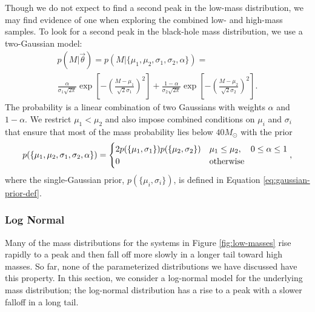 \documentclass[preprint]{aastex}
\newcommand{\Msun}{M_\odot}
\newcommand{\vtheta}{\vec{\theta}}
\begin{document}
Though we do not expect to find a second peak in the low-mass
distribution, we may find evidence of one when exploring the combined
low- and high-mass samples.  To look for a second peak in the
black-hole mass distribution, we use a two-Gaussian model:
\begin{multline}
  \label{eq:two-gaussian-def}
  p(M|\vtheta) = p(M|\{\mu_1, \mu_2, \sigma_1, \sigma_2, \alpha\}) = \\
  \frac{\alpha}{\sigma_1 \sqrt{2\pi}} \exp\left[ - \left( \frac{M -
        \mu_1}{\sqrt{2}\sigma_1} \right)^2 \right] + \frac{1-\alpha}{\sigma_2 \sqrt{2\pi}} \exp\left[ - \left( \frac{M -
        \mu_2}{\sqrt{2}\sigma_2} \right)^2 \right].
\end{multline}
The probability is a linear combination of two Gaussians with weights
$\alpha$ and $1-\alpha$.  We restrict $\mu_1 < \mu_2$ and also impose
combined conditions on $\mu_i$ and $\sigma_i$ that ensure that most of
the mass probability lies below $40 \Msun$ with the prior
\begin{equation}
  p(\{\mu_1, \mu_2, \sigma_1, \sigma_2, \alpha\}) = 
  \begin{cases}
    2 p(\{\mu_1, \sigma_1\}) p(\{\mu_2, \sigma_2\}) & \mu_1 \leq
    \mu_2, \quad 0 \leq \alpha \leq 1 \\
    0 & \textnormal{otherwise}
  \end{cases},
\end{equation}
where the single-Gaussian prior, $p(\{\mu_i, \sigma_i\})$, is defined
in Equation \eqref{eq:gaussian-prior-def}.

\subsubsection{Log Normal}
\label{sec:log-normal}

Many of the mass distributions for the systems in Figure
\ref{fig:low-masses} rise rapidly to a peak and then fall off more
slowly in a longer tail toward high masses.  So far, none of the
parameterized distributions we have discussed have this property.  In
this section, we consider a log-normal model for the underlying mass
distribution; the log-normal distribution has a rise to a peak with a
slower falloff in a long tail.  
\end{document}
